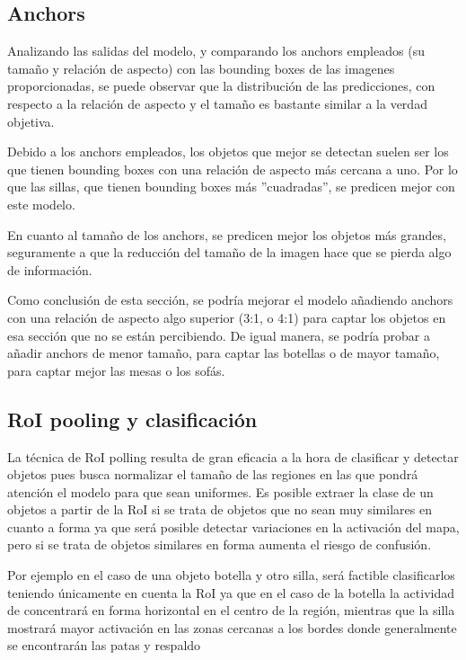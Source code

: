 \subsection{Anchors}

    Analizando las salidas del modelo, y comparando los anchors empleados 
    (su tamaño y relación de aspecto) con las bounding boxes de las imagenes proporcionadas, 
    se puede observar que la distribución de las predicciones, con respecto a la relación de aspecto 
    y el tamaño es bastante similar a la verdad objetiva.

    Debido a los anchors empleados, los objetos que mejor se detectan suelen ser 
    los que tienen bounding boxes con una relación de aspecto más cercana a uno. 
    Por lo que las sillas, que tienen bounding boxes más ''cuadradas'', se predicen mejor con este modelo.

    En cuanto al tamaño de los anchors, se predicen mejor los objetos más grandes, 
    seguramente a que la reducción del tamaño de la imagen hace que se pierda algo de información.

    Como conclusión de esta sección, se podría mejorar el modelo añadiendo 
    anchors con una relación de aspecto algo superior (3:1, o 4:1) para captar 
    los objetos en esa sección que no se están percibiendo. De igual manera, 
    se podría probar a añadir anchors de menor tamaño, para captar las botellas o de 
    mayor tamaño, para captar mejor las mesas o los sofás.

\subsection {RoI pooling y clasificación}

    La técnica de RoI polling resulta de gran eficacia a la hora de clasificar y detectar objetos pues busca normalizar el tamaño de las regiones en las que pondrá atención el modelo para que sean uniformes. Es posible extraer la clase de un objetos a partir de la RoI si se trata de objetos que no sean muy similares en cuanto a forma ya que será posible detectar variaciones en la activación del mapa, pero si se trata de objetos similares en forma aumenta el riesgo de confusión.
    
    Por ejemplo en el caso de una objeto botella y otro silla, será factible clasificarlos teniendo únicamente en cuenta la RoI ya que en el caso de la botella la actividad de concentrará en forma horizontal en el centro de la región, mientras que la silla mostrará mayor activación en las zonas cercanas a los bordes donde generalmente se encontrarán las patas y respaldo

